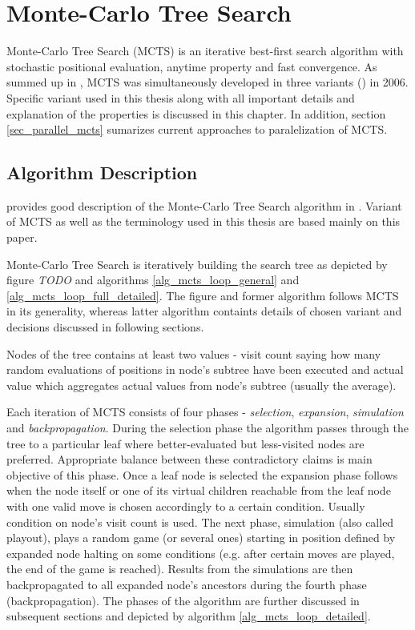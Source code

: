 \chapter{Monte-Carlo Tree Search}
\label{chap_mcts}

Monte-Carlo Tree Search (MCTS) is an iterative best-first search algorithm with stochastic positional
evaluation, anytime property and fast convergence. As \citeauthor{ChaslotPhd2010} summed up in 
\cite{ChaslotPhd2010}, MCTS was simultaneously developed
in three variants (\cites{Chaslot2006}{Coulom2006}{Kocsis2006}) in 2006. Specific variant used in
this thesis along with all important details and explanation of the properties is discussed in this
chapter. In addition, section \ref{sec_parallel_mcts} sumarizes current approaches to paralelization
of MCTS.


\section{Algorithm Description}

\citeauthor{Chaslot2008} provides good description of the Monte-Carlo Tree Search algorithm in
\cite{Chaslot2008}. Variant of MCTS as well as the terminology used in this thesis are based mainly
on this paper.

Monte-Carlo Tree Search is iteratively building the search tree as depicted by figure
\emph{TODO}%
and algorithms \ref{alg_mcts_loop_general} and \ref{alg_mcts_loop_full_detailed}.
The figure and former algorithm
follows MCTS in its generality, whereas latter algorithm containts details of chosen variant and
decisions discussed in following sections.
  
Nodes of the tree contains at least two values - visit count
saying how many random evaluations of positions in node's subtree have been executed and actual
value which aggregates actual values from node's subtree (usually the average).

Each iteration of MCTS consists of four
phases - \emph{selection}, \emph{expansion}, \emph{simulation} and \emph{backpropagation}. During
the selection phase the 
algorithm passes through the tree to a particular leaf where better-evaluated but less-visited nodes
are preferred. Appropriate balance between these contradictory claims is main objective of this
phase. Once a leaf node is selected the expansion phase follows when the node itself or one of its
virtual children reachable from the leaf node with one valid move is chosen accordingly to a certain
condition. Usually condition on node's visit count is used.
The next phase, simulation (also called playout), plays a random game (or several ones) starting
in position defined by expanded node halting on some conditions (e.g. after certain moves are
played, the end of the game is reached). Results from the simulations are then backpropagated to all
expanded node's ancestors during the fourth phase (backpropagation). The phases of the algorithm are
further discussed in subsequent sections and depicted by algorithm
\ref{alg_mcts_loop_detailed}.

